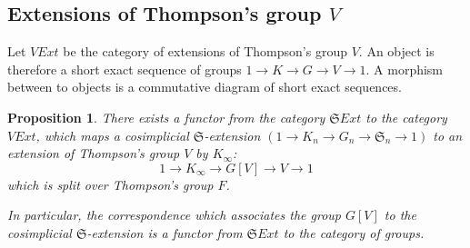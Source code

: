 \documentclass[twoside]{irmaems}
\theoremstyle{plain}
\newtheorem{proposition}[theorem]{Proposition}
\theoremstyle{definition}
\theoremstyle{remark}
\begin{document}
\subsection{Extensions of Thompson's group $V$}

Let $VExt$ be the category of extensions of Thompson's group $V$. An object is therefore a short exact sequence
of groups
$1\rightarrow K\longrightarrow G\longrightarrow V\rightarrow 1.$ 
 A morphism between to
objects is a commutative diagram of short exact sequences.

\begin{proposition}\label{construction}
There exists a functor from the category $\mathfrak{S}Ext$ to the category $VExt$, 
which maps a cosimplicial $\mathfrak{S}$-extension $(1\rightarrow K_{n}\longrightarrow G_{n}\longrightarrow \mathfrak{S}_{n}\rightarrow 1)$
to an extension of Thompson's group $V$ by $K_{\infty}$:\\

$$1\rightarrow K_{\infty}\longrightarrow G[V]\longrightarrow V\rightarrow 1$$
which is split over Thompson's group $F$.

\vspace{0.1cm}\noindent 
In particular, the correspondence which associates the group $G[V]$ to the cosimplicial $\mathfrak{S}$-extension
is a functor from $\mathfrak{S}Ext$ to the category of groups.

\end{proposition}
\end{document}
